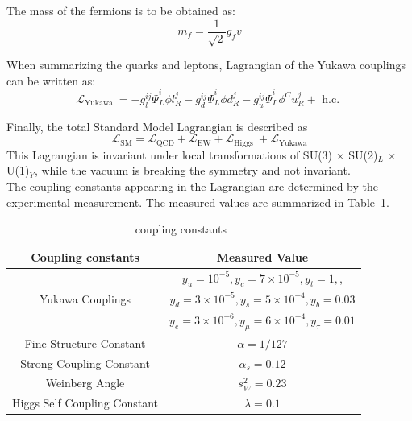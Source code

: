The mass of the fermions is to be obtained as:
\begin{equation}
m_{f}=\frac{1}{\sqrt{2}} g_{f} v
\end{equation}

When summarizing the quarks and leptons, Lagrangian of the Yukawa couplings can be written as:
\begin{equation}
\mathcal{L}_{\text {Yukawa }}=-g_{l}^{i j} \bar{\Psi}_{L}^{i} \phi l_{R}^{j}-g_{d}^{i j} \bar{\Psi}_{L}^{i} \phi d_{R}^{j}-g_{u}^{i j} \bar{\Psi}_{L}^{i} \phi^{C} u_{R}^{j}+\text { h.c. }
\end{equation}

Finally, the total Standard Model Lagrangian is described as 
\begin{equation}
\mathcal{L}_{\mathrm{SM}}=\mathcal{L}_{\mathrm{QCD}}+\mathcal{L}_{\mathrm{EW}}+\mathcal{L}_{\text {Higgs }}+\mathcal{L}_{\text {Yukawa}}
\end{equation}
This Lagrangian is invariant under local transformations of SU(3) $\times$ SU(2)$_L$ $\times$ U(1)$_Y$, while the vacuum is breaking the symmetry and not invariant. \\

The coupling constants appearing in the Lagrangian are determined by the experimental measurement. 
The measured values are summarized in Table~\ref{tab:constants}.  \\

\begin{center}
\begin{table}
\centering
\begin{tabular}{|c|c|}
\hline
Coupling constants & Measured Value \\
\hline 
                             & $y_{u}=10^{-5}, y_{c}=7 \times 10^{-5}, y_{t}=1,$, \\
            Yukawa Couplings & $y_{d}=3 \times 10^{-5}, y_{s}=5 \times 10^{-4}, y_{b}=0.03$ \\
                             & $y_{e}=3 \times 10^{-6}, y_{\mu}=6 \times 10^{-4}, y_{\tau}=0.01$ \\
     Fine Structure Constant & $\alpha=1 / 127$ \\
    Strong Coupling Constant & $\alpha_{s}=0.12$ \\
              Weinberg Angle & $s_{W}^{2}=0.23$ \\
Higgs Self Coupling Constant & $\lambda=0.1$ \\
\hline
\end{tabular}
\caption{coupling constants~\cite{PhysRevD.98.030001}}
\label{tab:constants}
\end{table}
\end{center}

